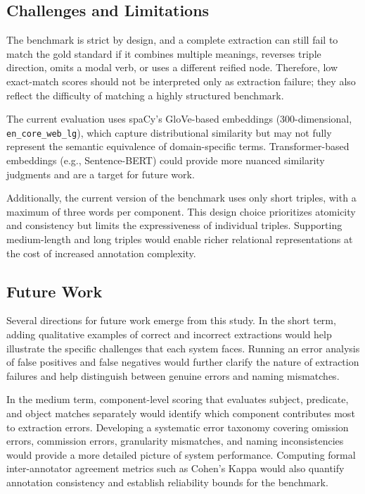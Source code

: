 \documentclass[conference]{IEEEtran}
\begin{document}
\subsection{Challenges and Limitations}
The benchmark is strict by design, and a complete extraction can still fail to match the gold standard if it combines multiple meanings, reverses triple direction, omits a modal verb, or uses a different reified node. Therefore, low exact-match scores should not be interpreted only as extraction failure; they also reflect the difficulty of matching a highly structured benchmark.

The current evaluation uses spaCy's GloVe-based embeddings (300-dimensional, \texttt{en\_core\_web\_lg}), which capture distributional similarity but may not fully represent the semantic equivalence of domain-specific terms. Transformer-based embeddings (e.g., Sentence-BERT) could provide more nuanced similarity judgments and are a target for future work.

Additionally, the current version of the benchmark uses only short triples, with a maximum of three words per component. This design choice prioritizes atomicity and consistency but limits the expressiveness of individual triples. Supporting medium-length and long triples would enable richer relational representations at the cost of increased annotation complexity.

\subsection{Future Work}
Several directions for future work emerge from this study. In the short term, adding qualitative examples of correct and incorrect extractions would help illustrate the specific challenges that each system faces. Running an error analysis of false positives and false negatives would further clarify the nature of extraction failures and help distinguish between genuine errors and naming mismatches.

In the medium term, component-level scoring that evaluates subject, predicate, and object matches separately would identify which component contributes most to extraction errors. Developing a systematic error taxonomy covering omission errors, commission errors, granularity mismatches, and naming inconsistencies would provide a more detailed picture of system performance. Computing formal inter-annotator agreement metrics such as Cohen's Kappa would also quantify annotation consistency and establish reliability bounds for the benchmark.
\end{document}
